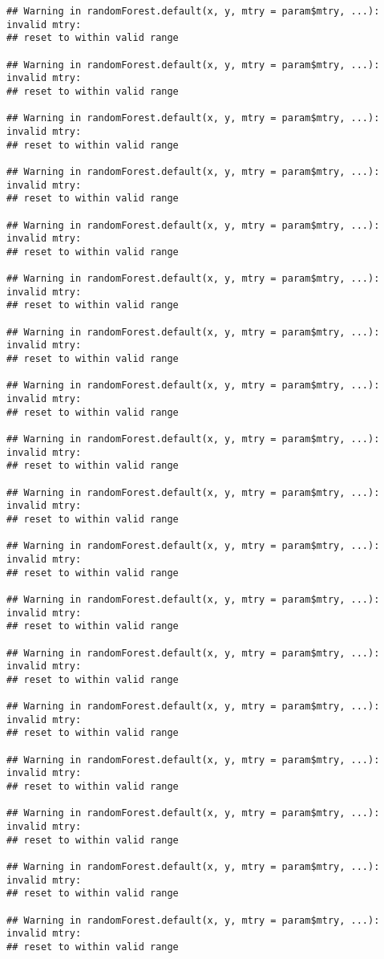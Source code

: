 \documentclass[
]{article}
\begin{document}
\begin{verbatim}
## Warning in randomForest.default(x, y, mtry = param$mtry, ...): invalid mtry:
## reset to within valid range

## Warning in randomForest.default(x, y, mtry = param$mtry, ...): invalid mtry:
## reset to within valid range

## Warning in randomForest.default(x, y, mtry = param$mtry, ...): invalid mtry:
## reset to within valid range

## Warning in randomForest.default(x, y, mtry = param$mtry, ...): invalid mtry:
## reset to within valid range

## Warning in randomForest.default(x, y, mtry = param$mtry, ...): invalid mtry:
## reset to within valid range

## Warning in randomForest.default(x, y, mtry = param$mtry, ...): invalid mtry:
## reset to within valid range

## Warning in randomForest.default(x, y, mtry = param$mtry, ...): invalid mtry:
## reset to within valid range

## Warning in randomForest.default(x, y, mtry = param$mtry, ...): invalid mtry:
## reset to within valid range

## Warning in randomForest.default(x, y, mtry = param$mtry, ...): invalid mtry:
## reset to within valid range

## Warning in randomForest.default(x, y, mtry = param$mtry, ...): invalid mtry:
## reset to within valid range

## Warning in randomForest.default(x, y, mtry = param$mtry, ...): invalid mtry:
## reset to within valid range

## Warning in randomForest.default(x, y, mtry = param$mtry, ...): invalid mtry:
## reset to within valid range

## Warning in randomForest.default(x, y, mtry = param$mtry, ...): invalid mtry:
## reset to within valid range

## Warning in randomForest.default(x, y, mtry = param$mtry, ...): invalid mtry:
## reset to within valid range

## Warning in randomForest.default(x, y, mtry = param$mtry, ...): invalid mtry:
## reset to within valid range

## Warning in randomForest.default(x, y, mtry = param$mtry, ...): invalid mtry:
## reset to within valid range

## Warning in randomForest.default(x, y, mtry = param$mtry, ...): invalid mtry:
## reset to within valid range

## Warning in randomForest.default(x, y, mtry = param$mtry, ...): invalid mtry:
## reset to within valid range


\end{verbatim}
\end{document}
